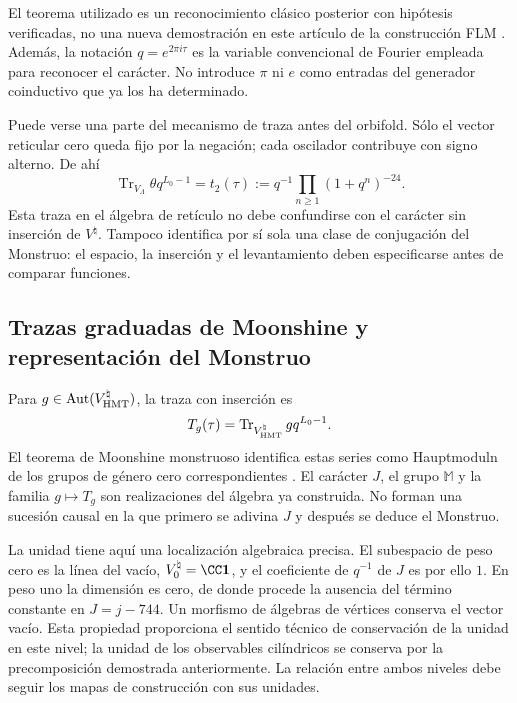 El teorema utilizado es un reconocimiento clásico posterior con
hipótesis verificadas, no una nueva demostración en este artículo de
la construcción FLM \cite{flm}.
Además, la notación $q=e^{2\pi i\tau}$ es la variable convencional
de Fourier empleada para reconocer el carácter. No introduce $\pi$
ni $e$ como entradas del generador coinductivo que ya los ha determinado.

Puede verse una parte del mecanismo de traza antes del orbifold.
Sólo el vector reticular cero queda fijo por la negación; cada
oscilador contribuye con signo alterno. De ahí
\[
 \operatorname{Tr}_{V_\Lambda}\theta q^{L_0-1}
   =t_2(\tau)
   :=q^{-1}\prod_{n\geq1}(1+q^n)^{-24}.
\]
Esta traza en el álgebra de retículo no debe confundirse con el
carácter sin inserción de $V^\natural$. Tampoco identifica por sí
sola una clase de conjugación del Monstruo: el espacio, la inserción
y el levantamiento deben especificarse antes de comparar funciones.








\subsection{Trazas graduadas de Moonshine y representación del Monstruo}
\label{exc:alcance}

Para $g\in\operatorname{Aut}(V^\natural_{\rm HMT})$, la traza
con inserción es
\[
 T_g(\tau)=
 \operatorname{Tr}_{V^\natural_{\rm HMT}}gq^{L_0-1}.
\]
El teorema de Moonshine monstruoso identifica estas series como
Hauptmoduln de los grupos de género cero correspondientes
\cite[teorema~1.1]{borcherds}.
El carácter $J$, el grupo $\mathbb M$ y la familia $g\mapsto T_g$
son realizaciones del álgebra ya construida. No forman una sucesión
causal en la que primero se adivina $J$ y después se deduce el Monstruo.

La unidad tiene aquí una localización algebraica precisa. El subespacio
de peso cero es la línea del vacío, \(V^\natural_0=\CC\mathbf1\), y
el coeficiente de \(q^{-1}\) de \(J\) es por ello \(1\). En peso uno
la dimensión es cero, de donde procede la ausencia del término constante
en \(J=j-744\). Un morfismo de álgebras de vértices conserva el vector
vacío. Esta propiedad proporciona el sentido técnico de conservación
de la unidad en este nivel; la unidad de los observables cilíndricos
se conserva por la precomposición demostrada anteriormente. La relación
entre ambos niveles debe seguir los mapas de construcción con sus unidades.

